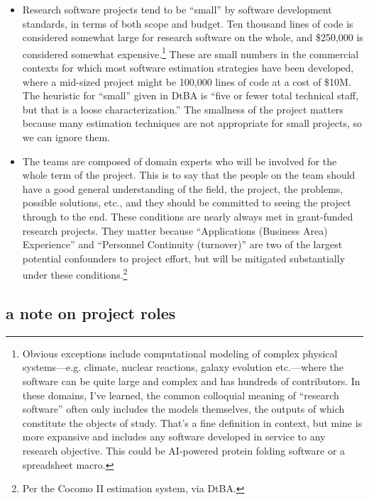 \documentclass[12pt,oneside]{book}
\begin{document}
\begin{itemize}[wide, labelwidth=!, labelindent=0pt, font=\bfseries]
\item Research software projects tend to be ``small'' by software development standards, in terms of both scope and budget. Ten thousand lines of code is considered somewhat large for research software on the whole, and \$250,000 is considered somewhat expensive.\footnote{Obvious exceptions include computational modeling of complex physical systems---e.g. climate, nuclear reactions, galaxy evolution etc.---where the software can be quite large and complex and has hundreds of contributors. In these domains, I've learned, the common colloquial meaning of ``research software'' often only includes the models themselves, the outputs of which constitute the objects of study. That's a fine definition in context, but mine is more expansive and includes any software developed in service to any research objective. This could be AI-powered protein folding software or a spreadsheet macro.} These are small numbers in the commercial contexts for which most software estimation strategies have been developed, where a mid-sized project might be 100,000 lines of code at a cost of \$10M. The heuristic for ``small'' given in DtBA is ``five or fewer total technical staff, but that is a loose characterization.'' The smallness of the project matters because many estimation techniques are not appropriate for small projects, so we can ignore them.
\item The teams are composed of domain experts who will be involved for the whole term of the project. This is to say that the people on the team should have a good general understanding of the field, the project, the problems, possible solutions, etc., and they should be committed to seeing the project through to the end. These conditions are nearly always met in grant-funded research projects. They matter because ``Applications (Business Area) Experience'' and ``Personnel Continuity (turnover)'' are two of the largest potential confounders to project effort, but will be mitigated substantially under these conditions.\footnote{Per the Cocomo II estimation system, via DtBA.}
\end{itemize}

\newpage
\subsection*{a note on project roles}
\end{document}
